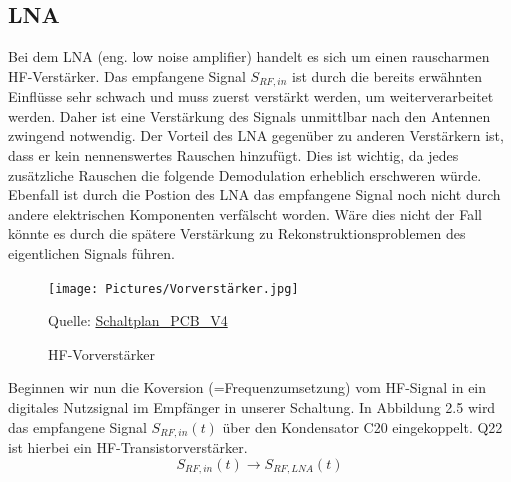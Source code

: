 \subsection{LNA}
Bei dem LNA (eng. low noise amplifier) handelt es sich um einen rauscharmen HF-Verstärker. Das empfangene Signal $S_{RF,in}$ ist
durch die bereits erwähnten Einflüsse sehr schwach und muss  zuerst verstärkt werden, um weiterverarbeitet werden. Daher
ist eine Verstärkung des Signals unmittlbar nach den Antennen zwingend notwendig. Der Vorteil des LNA gegenüber zu
anderen Verstärkern ist, dass er kein nennenswertes Rauschen hinzufügt. Dies ist wichtig, da jedes zusätzliche Rauschen
die folgende Demodulation erheblich erschweren würde. Ebenfall ist durch die Postion des LNA das empfangene Signal noch 
nicht durch andere elektrischen Komponenten verfälscht worden. Wäre dies nicht der Fall könnte es durch die spätere Verstärkung zu 
Rekonstruktionsproblemen des eigentlichen Signals führen.
\begin{figure}[H]
    \centering
    \texttt{[image: Pictures/Vorverstärker.jpg]}
    \caption{HF-Vorverstärker}
    \footnotesize{Quelle: \url{Schaltplan_PCB_V4}}
\end{figure}


Beginnen wir nun die Koversion (=Frequenzumsetzung) vom HF-Signal in ein digitales Nutzsignal im Empfänger in unserer Schaltung. In Abbildung 2.5
wird das empfangene Signal $S_{RF,in}(t)$ über den Kondensator C20 eingekoppelt. Q22 ist hierbei ein HF-Transistorverstärker.\\
\[
S_{RF,in}(t) \rightarrow S_{RF,LNA}(t)
\]
